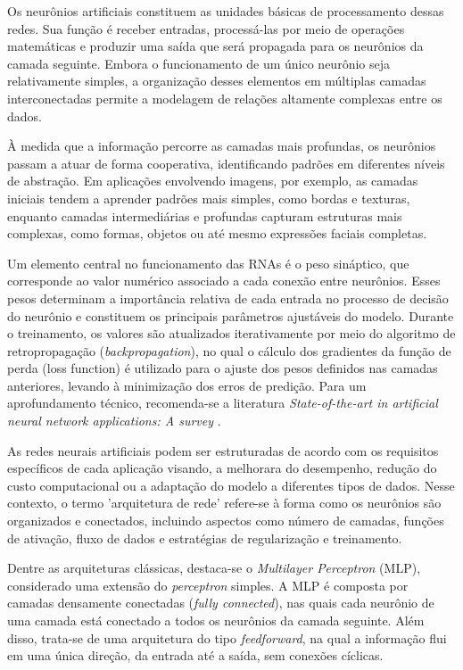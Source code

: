 Os neurônios artificiais constituem as unidades básicas de processamento dessas redes. Sua função é receber entradas, processá-las por meio de operações matemáticas e produzir uma saída que será propagada para os neurônios da camada seguinte. Embora o funcionamento de um único neurônio seja relativamente simples, a organização desses elementos em múltiplas camadas interconectadas permite a modelagem de relações altamente complexas entre os dados.

À medida que a informação percorre as camadas mais profundas, os neurônios passam a atuar de forma cooperativa, identificando padrões em diferentes níveis de abstração. Em aplicações envolvendo imagens, por exemplo, as camadas iniciais tendem a aprender padrões mais simples, como bordas e texturas, enquanto camadas intermediárias e profundas capturam estruturas mais complexas, como formas, objetos ou até mesmo expressões faciais completas.

Um elemento central no funcionamento das \acsp{RNA} é o peso sináptico, que corresponde ao valor numérico associado a cada conexão entre neurônios. Esses pesos determinam a importância relativa de cada entrada no processo de decisão do neurônio e constituem os principais parâmetros ajustáveis do modelo. Durante o treinamento, os valores são atualizados iterativamente por meio do algoritmo de retropropagação (\textit{backpropagation}), no qual o cálculo dos gradientes da função de perda (loss function) é utilizado para o ajuste dos pesos definidos nas camadas anteriores, levando à minimização dos erros de predição. Para um aprofundamento técnico, recomenda-se a literatura \textit{State-of-the-art in artificial neural network applications: A survey} \cite{abiodun2018}.

As redes neurais artificiais podem ser estruturadas de acordo com os requisitos específicos de cada aplicação visando, a melhorara do desempenho, redução do custo computacional ou a adaptação do modelo a diferentes tipos de dados. Nesse contexto, o termo 'arquitetura de rede' refere-se à forma como os neurônios são organizados e conectados, incluindo aspectos como número de camadas, funções de ativação, fluxo de dados e estratégias de regularização e treinamento.

Dentre as arquiteturas clássicas, destaca-se o \textit{Multilayer Perceptron} (\acs{MLP}), considerado uma extensão do \textit{perceptron} simples. A \acs{MLP} é composta por camadas densamente conectadas (\textit{fully connected}), nas quais cada neurônio de uma camada está conectado a todos os neurônios da camada seguinte. Além disso, trata-se de uma arquitetura do tipo \textit{feedforward}, na qual a informação flui em uma única direção, da entrada até a saída, sem conexões cíclicas.

